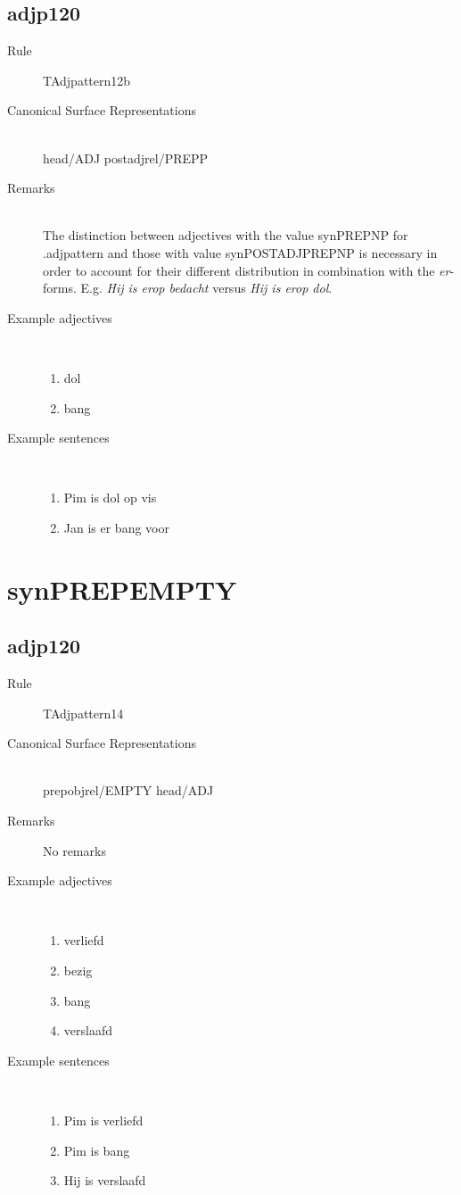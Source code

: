  \subsection{adjp120}
\begin{description}
  \item [Rule] TAdjpattern12b
  \item [Canonical Surface Representations] \mbox{}\\
head/ADJ postadjrel/PREPP
  \item [Remarks]  \mbox{}\\The distinction between adjectives with the value 
synPREPNP  for .adjpattern and those with value synPOSTADJPREPNP is necessary
in order to account for their different distribution in combination with 
the {\em er}-forms. E.g. {\em Hij is erop bedacht}
 versus 
{\em *Hij is erop dol}. 
  \item [Example adjectives] \mbox{}\\
\begin{enumerate}
  \item dol
  \item bang
\end{enumerate}
  \item [Example sentences]\mbox{}\\
\begin{enumerate}
  \item Pim is dol op vis
  \item Jan is er bang voor
\end{enumerate}
\end{description}
\newpage
\section{synPREPEMPTY}
  \subsection{adjp120}
\begin{description}
  \item [Rule] TAdjpattern14
  \item [Canonical Surface Representations] \mbox{}\\
prepobjrel/EMPTY head/ADJ
  \item [Remarks]  No remarks
  \item [Example adjectives] \mbox{}\\
\begin{enumerate}
  \item verliefd
  \item bezig
  \item bang 
  \item verslaafd
\end{enumerate}
  \item [Example sentences]\mbox{}\\
\begin{enumerate}
  \item Pim is verliefd 
  \item Pim is bang
  \item Hij is verslaafd
\end{enumerate}
\end{description}
\newpage
